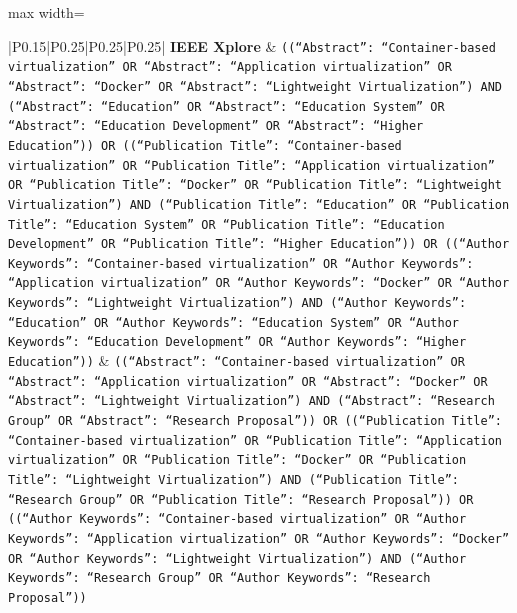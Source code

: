 \begin{table}[htbp]
\begin{adjustbox}{max width=\textwidth}
\begin{tabular}{|P{0.15\linewidth}|P{0.25\linewidth}|P{0.25\linewidth}|P{0.25\linewidth}|}
\textbf{IEEE Xplore} 
& \tiny \texttt{((``Abstract'': ``Container-based virtualization'' OR ``Abstract'': ``Application virtualization'' OR ``Abstract'': ``Docker'' OR ``Abstract'': ``Lightweight Virtualization'') AND (``Abstract'': ``Education'' OR ``Abstract'': ``Education System'' OR ``Abstract'': ``Education Development''  OR ``Abstract'': ``Higher Education'')) OR ((``Publication Title'': ``Container-based virtualization'' OR ``Publication Title'': ``Application virtualization'' OR ``Publication Title'': ``Docker'' OR ``Publication Title'': ``Lightweight Virtualization'') AND (``Publication Title'': ``Education'' OR ``Publication Title'': ``Education System'' OR ``Publication Title'': ``Education Development''  OR ``Publication Title'': ``Higher Education'')) OR ((``Author Keywords'': ``Container-based virtualization'' OR ``Author Keywords'': ``Application virtualization'' OR ``Author Keywords'': ``Docker'' OR ``Author Keywords'': ``Lightweight Virtualization'') AND (``Author Keywords'': ``Education'' OR ``Author Keywords'': ``Education System'' OR ``Author Keywords'': ``Education Development''  OR ``Author Keywords'': ``Higher Education''))} 
& \tiny \texttt{((``Abstract'': ``Container-based virtualization'' OR ``Abstract'': ``Application virtualization'' OR ``Abstract'': ``Docker'' OR ``Abstract'': ``Lightweight Virtualization'') AND (``Abstract'': ``Research Group'' OR ``Abstract'': ``Research Proposal'')) OR ((``Publication Title'': ``Container-based virtualization'' OR ``Publication Title'': ``Application virtualization'' OR ``Publication Title'': ``Docker'' OR ``Publication Title'': ``Lightweight Virtualization'') AND (``Publication Title'': ``Research Group'' OR ``Publication Title'': ``Research Proposal'')) OR ((``Author Keywords'': ``Container-based virtualization'' OR ``Author Keywords'': ``Application virtualization'' OR ``Author Keywords'': ``Docker'' OR ``Author Keywords'': ``Lightweight Virtualization'') AND (``Author Keywords'': ``Research Group'' OR ``Author Keywords'': ``Research Proposal''))} 

\end{tabular}
\end{adjustbox}
\end{table}
